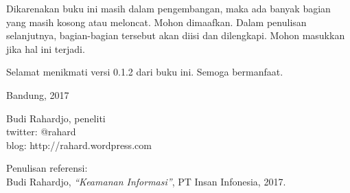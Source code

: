 Dikarenakan buku ini masih dalam pengembangan, maka ada banyak bagian yang
masih kosong atau meloncat. Mohon dimaafkan. Dalam penulisan selanjutnya,
bagian-bagian tersebut akan diisi dan dilengkapi. Mohon masukkan jika hal ini
terjadi.

Selamat menikmati versi 0.1.2 dari buku ini. Semoga bermanfaat.
\vspace{5 mm}

Bandung, 2017


Budi Rahardjo, peneliti\\
twitter: @rahard\\
blog: http://rahard.wordpress.com

\vspace{5 mm}
Penulisan referensi:\\
Budi Rahardjo, {\em ``Keamanan Informasi''}, PT Insan Infonesia, 2017.

\doclicenseThis
